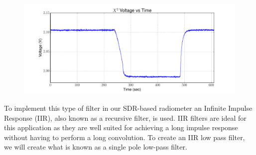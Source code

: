 {\begin{figure}[h!tb] 
\centering
\includegraphics[width=17cm]{Experiments/Exp1/x2_filter.pdf}
\label{square_raw_filt}
\end{figure}
}

To implement this type of filter in our SDR-based radiometer an Infinite Impulse Response (IIR), also known as a recursive filter, is used.  IIR filters are ideal for this application as they are well suited for achieving a long impulse response without having to perform a long convolution.  To create an IIR low pass filter, we will create what is known as a single pole low-pass filter.  



